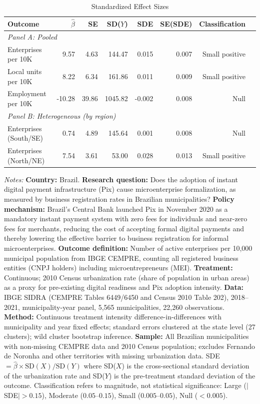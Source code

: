 \begin{table}[htbp]
\centering
\caption{Standardized Effect Sizes}
\label{tab:sde}
\begin{tabular}{lrrrrrrr}
\toprule
Outcome & $\hat{\beta}$ & SE & SD($Y$) & SDE & SE(SDE) & Classification \\
\midrule
\multicolumn{7}{l}{\textit{Panel A: Pooled}} \\
Enterprises per 10K & 9.57 & 4.63 & 144.47 & 0.015 & 0.007 & Small positive \\
Local units per 10K & 8.22 & 6.34 & 161.86 & 0.011 & 0.009 & Small positive \\
Employment per 10K & -10.28 & 39.86 & 1045.82 & -0.002 & 0.008 & Null \\
\midrule
\multicolumn{7}{l}{\textit{Panel B: Heterogeneous (by region)}} \\
Enterprises (South/SE) & 0.74 & 4.89 & 145.64 & 0.001 & 0.008 & Null \\
Enterprises (North/NE) & 7.54 & 3.61 & 53.00 & 0.028 & 0.013 & Small positive \\
\bottomrule
\end{tabular}
\begin{tablenotes}
\item \textit{Notes:} \textbf{Country:} Brazil. \textbf{Research question:} Does the adoption of instant digital payment infrastructure (Pix) cause microenterprise formalization, as measured by business registration rates in Brazilian municipalities? \textbf{Policy mechanism:} Brazil's Central Bank launched Pix in November 2020 as a mandatory instant payment system with zero fees for individuals and near-zero fees for merchants, reducing the cost of accepting formal digital payments and thereby lowering the effective barrier to business registration for informal microenterprises. \textbf{Outcome definition:} Number of active enterprises per 10,000 municipal population from IBGE CEMPRE, counting all registered business entities (CNPJ holders) including microentrepreneurs (MEI). \textbf{Treatment:} Continuous; 2010 Census urbanization rate (share of population in urban areas) as a proxy for pre-existing digital readiness and Pix adoption intensity. \textbf{Data:} IBGE SIDRA (CEMPRE Tables 6449/6450 and Census 2010 Table 202), 2018--2021, municipality-year panel, 5,565 municipalities, 22,260 observations. \textbf{Method:} Continuous treatment intensity difference-in-differences with municipality and year fixed effects; standard errors clustered at the state level (27 clusters); wild cluster bootstrap inference. \textbf{Sample:} All Brazilian municipalities with non-missing CEMPRE data and 2010 Census population; excludes Fernando de Noronha and other territories with missing urbanization data. SDE $= \hat{\beta} \times \text{SD}(X) / \text{SD}(Y)$ where SD($X$) is the cross-sectional standard deviation of the urbanization rate and SD($Y$) is the pre-treatment standard deviation of the outcome. Classification refers to magnitude, not statistical significance: Large ($|$SDE$| > 0.15$), Moderate ($0.05$--$0.15$), Small ($0.005$--$0.05$), Null ($< 0.005$).
\end{tablenotes}
\end{table}
